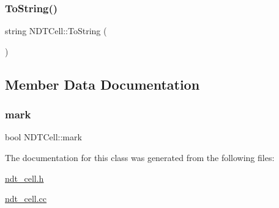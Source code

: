 \mbox{\label{classNDTCell_ae1e1133b097ce7e78fbff8a1fda4ae59}} 
\subsubsection{\texorpdfstring{To\+String()}{ToString()}}
{\footnotesize\ttfamily string N\+D\+T\+Cell\+::\+To\+String (\begin{DoxyParamCaption}{ }\end{DoxyParamCaption})}



\subsection{Member Data Documentation}
\mbox{\label{classNDTCell_ae2c7aeea3860e92433adc72d108d65b4}} 
\subsubsection{\texorpdfstring{mark}{mark}}
{\footnotesize\ttfamily bool N\+D\+T\+Cell\+::mark}



The documentation for this class was generated from the following files\+:\begin{DoxyCompactItemize}
\item 
\hyperlink{ndt__cell_8h}{ndt\+\_\+cell.\+h}\item 
\hyperlink{ndt__cell_8cc}{ndt\+\_\+cell.\+cc}\end{DoxyCompactItemize}
